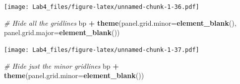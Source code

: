 \documentclass[]{article}
\newenvironment{Shaded}{\begin{snugshade}}{\end{snugshade}}
\newcommand{\KeywordTok}[1]{\textcolor[rgb]{0.13,0.29,0.53}{\textbf{#1}}}
\newcommand{\DataTypeTok}[1]{\textcolor[rgb]{0.13,0.29,0.53}{#1}}
\newcommand{\DecValTok}[1]{\textcolor[rgb]{0.00,0.00,0.81}{#1}}
\newcommand{\StringTok}[1]{\textcolor[rgb]{0.31,0.60,0.02}{#1}}
\newcommand{\CommentTok}[1]{\textcolor[rgb]{0.56,0.35,0.01}{\textit{#1}}}
\newcommand{\ControlFlowTok}[1]{\textcolor[rgb]{0.13,0.29,0.53}{\textbf{#1}}}
\newcommand{\OperatorTok}[1]{\textcolor[rgb]{0.81,0.36,0.00}{\textbf{#1}}}
\newcommand{\NormalTok}[1]{#1}
\begin{document}
\begin{Shaded}
\end{Shaded}

\texttt{[image: Lab4\_files/figure-latex/unnamed-chunk-1-36.pdf]}

\begin{Shaded}
\begin{Highlighting}[]
\CommentTok{# Hide all the gridlines}
\NormalTok{bp }\OperatorTok{+}\StringTok{ }\KeywordTok{theme}\NormalTok{(}\DataTypeTok{panel.grid.minor=}\KeywordTok{element_blank}\NormalTok{(),}
           \DataTypeTok{panel.grid.major=}\KeywordTok{element_blank}\NormalTok{())}
\end{Highlighting}
\end{Shaded}

\texttt{[image: Lab4\_files/figure-latex/unnamed-chunk-1-37.pdf]}

\begin{Shaded}
\begin{Highlighting}[]
\CommentTok{# Hide just the minor gridlines}
\NormalTok{bp }\OperatorTok{+}\StringTok{ }\KeywordTok{theme}\NormalTok{(}\DataTypeTok{panel.grid.minor=}\KeywordTok{element_blank}\NormalTok{())}
\end{Highlighting}
\end{Shaded}
\end{document}
